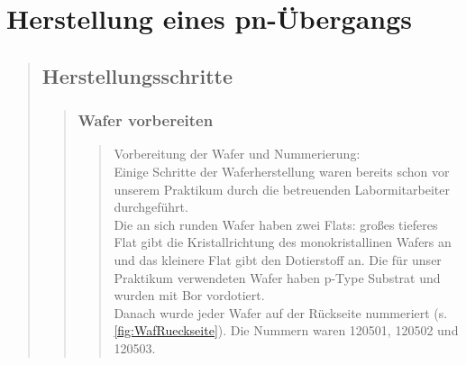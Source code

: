 \section{Herstellung eines pn-Übergangs}
\begin{quote}

	\subsection{Herstellungsschritte}
	\begin{quote}
	
		\subsubsection{Wafer vorbereiten}
        \begin{quote}
			Vorbereitung der Wafer und Nummerierung:\\
			
			Einige Schritte der Waferherstellung waren bereits schon vor 
			unserem Praktikum durch die betreuenden Labormitarbeiter 
			durchgeführt.\\

			Die an sich runden Wafer haben zwei Flats:  großes tieferes Flat 
			gibt die Kristallrichtung des monokristallinen Wafers an und das 
			kleinere Flat gibt den Dotierstoff an. Die für unser Praktikum 
			verwendeten Wafer haben p-Type Substrat und wurden  mit Bor 
			vordotiert.\\
			
			Danach wurde jeder Wafer auf der Rückseite nummeriert (s. \ref{fig:WafRueckseite}). 
			Die Nummern waren 120501, 120502 und 120503.\\
			
			\vspace{2em}
			

\end{quote}
\end{quote}
\end{quote}
